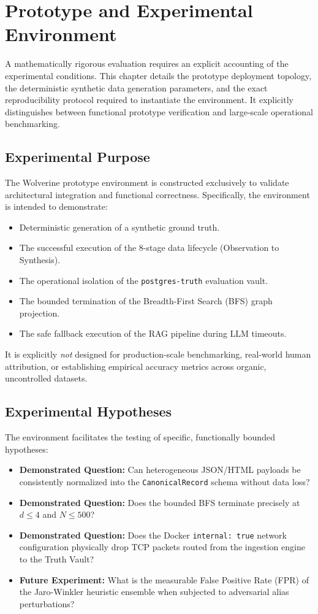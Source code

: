 \chapter{Prototype and Experimental Environment}
\label{ch:experimental-environment}

A mathematically rigorous evaluation requires an explicit accounting of the experimental conditions. This chapter details the prototype deployment topology, the deterministic synthetic data generation parameters, and the exact reproducibility protocol required to instantiate the environment. It explicitly distinguishes between functional prototype verification and large-scale operational benchmarking.

\section{Experimental Purpose}
\label{sec:exp-purpose}
The Wolverine prototype environment is constructed exclusively to validate architectural integration and functional correctness. Specifically, the environment is intended to demonstrate:
\begin{itemize}
    \item Deterministic generation of a synthetic ground truth.
    \item The successful execution of the 8-stage data lifecycle (Observation to Synthesis).
    \item The operational isolation of the \texttt{postgres-truth} evaluation vault.
    \item The bounded termination of the Breadth-First Search (BFS) graph projection.
    \item The safe fallback execution of the RAG pipeline during LLM timeouts.
\end{itemize}
It is explicitly \textit{not} designed for production-scale benchmarking, real-world human attribution, or establishing empirical accuracy metrics across organic, uncontrolled datasets.

\section{Experimental Hypotheses}
\label{sec:exp-hypotheses}
The environment facilitates the testing of specific, functionally bounded hypotheses:
\begin{itemize}
    \item \textbf{Demonstrated Question:} Can heterogeneous JSON/HTML payloads be consistently normalized into the \texttt{CanonicalRecord} schema without data loss?
    \item \textbf{Demonstrated Question:} Does the bounded BFS terminate precisely at $d \le 4$ and $N \le 500$?
    \item \textbf{Demonstrated Question:} Does the Docker \texttt{internal: true} network configuration physically drop TCP packets routed from the ingestion engine to the Truth Vault?
    \item \textbf{Future Experiment:} What is the measurable False Positive Rate (FPR) of the Jaro-Winkler heuristic ensemble when subjected to adversarial alias perturbations?
\end{itemize}

